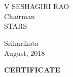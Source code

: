\documentclass[a4paper, 12pt, oneside]{Thesis}  %
\begin{document}
	\vspace*{0.25in}
	
	\parbox{2.2in}
	{
		 \\
		\noindent {\bf} \\
		\noindent             V SESHAGIRI RAO \\ 
		\noindent Chairman\\
		\noindent STARS\\
	} 
	\newline
	\hspace*{2.5in}
	\noindent Sriharikota\\
	\hspace*{2.4in}
	August, 2018
	\clearpage
	\vspace*{36pt}
	\begin{center}
		{\large \bf CERTIFICATE}
	\end{center}
	
	
	\vspace*{24pt}
	
\end{document}
